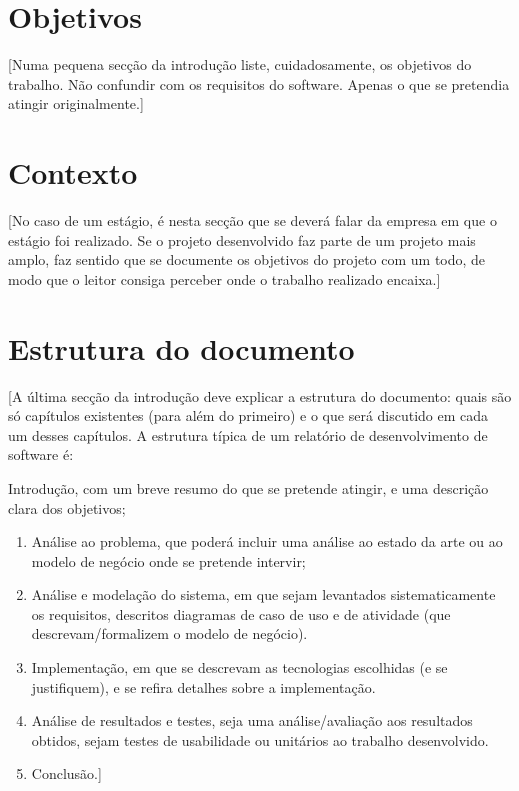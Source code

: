 \section{Objetivos}
[Numa pequena secção da introdução liste, cuidadosamente, os objetivos do trabalho. Não confundir com os requisitos do software. Apenas o que se pretendia atingir originalmente.] 
\section{Contexto}
[No caso de um estágio, é nesta secção que se deverá falar da empresa em que o estágio foi realizado. Se o projeto desenvolvido faz parte de um projeto mais amplo, faz sentido que se documente os objetivos do projeto com um todo, de modo que o leitor consiga perceber onde o trabalho realizado encaixa.] 
\section{Estrutura do documento}
[A última secção da introdução deve explicar a estrutura do documento: quais são só capítulos existentes (para além do primeiro) e o que será discutido em cada um desses capítulos. A estrutura típica de um relatório de desenvolvimento de software é: 

Introdução, com um breve resumo do que se pretende atingir, e uma descrição clara dos objetivos;

\begin{enumerate}
    \item Análise ao problema, que poderá incluir uma análise ao estado da arte ou ao modelo de negócio onde se pretende intervir;
    \item Análise e modelação do sistema, em que sejam levantados sistematicamente os requisitos, descritos diagramas de caso de uso e de atividade (que descrevam/formalizem o modelo de negócio). 
    \item Implementação, em que se descrevam as tecnologias escolhidas (e se justifiquem), e se refira detalhes sobre a implementação.
    \item Análise de resultados e testes, seja uma análise/avaliação aos resultados obtidos, sejam testes de usabilidade ou unitários ao trabalho desenvolvido. 
    \item Conclusão.]
\end{enumerate}{}
